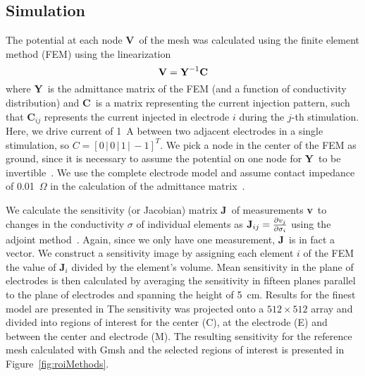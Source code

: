 \documentclass[12pt]{iopart}
\newcommand{\VB}{{\mbox{\bf V}}}
\newcommand{\YB}{{\mbox{\bf Y}}}
\newcommand{\CB}{{\mbox{\bf C}}}
\newcommand{\JB}{{\mbox{\bf J}}}
\newcommand{\vB}{{\mbox{\bf v}}}
\newcommand{\COMMENT}[1]{ \textsf{\color{blue}{{COMMENT: #1}}} }
\begin{document}
%
%
%

\subsection{Simulation}
The potential at each node \VB\ of the mesh was calculated using the finite
element method (FEM) using the linearization 
\begin{equation}
\VB = \YB^{-1}\CB
\end{equation}
where \YB\ is the admittance matrix of the FEM (and a function of conductivity
distribution) and \CB\ is a matrix representing the current injection pattern,
such that \CB$_{ij}$ represents the current injected in electrode $i$ during
the $j$-th stimulation. Here, we drive current of 1~A between two adjacent
electrodes in a single stimulation, so $C = [0\,|\,0\,|\,1\,|\,-1]^T$. 
We pick a node in the center of the FEM as ground, since it is necessary to
assume the potential on
one node for \YB\ to be invertible~\parencite{Adler1996a}.
We use the complete electrode model and assume contact impedance of
0.01~$\Omega$ in the calculation of the admittance
matrix~\parencite{polydorides_electrode_2002}. 


We calculate the sensitivity (or Jacobian) matrix \JB\ of measurements \vB\ to
changes in the conductivity $\sigma$ of individual elements as
$\JB_{ij}=\frac{\partial v_j}{\partial \sigma_i}$ using the adjoint
method~\parencite{polydorides_electrode_2002}. Again, since we only have one measurement, \JB\
is in fact a vector.
We construct a sensitivity image by assigning each element
$i$ of the FEM the value of \JB$_i$ divided by the element's volume.
Mean sensitivity in the plane of electrodes is then calculated by averaging
the sensitivity in fifteen planes parallel to the plane of electrodes and
spanning the height of 5~cm. Results for the finest model are presented in 
The sensitivity was projected onto a $512\times512$ array and divided into regions
of interest for the center (C), at the electrode (E) and between the center and electrode
(M). The resulting sensitivity for the reference mesh calculated with Gmsh and the 
selected regions of interest is presented in Figure~\ref{fig:roiMethods}.
\end{document}
